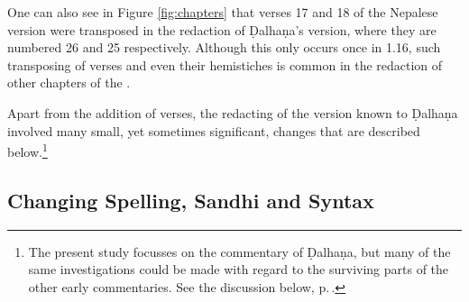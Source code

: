 One can also see in Figure \ref{fig:chapters} that verses 17 and 18 of the
Nepalese version were transposed in the redaction of Ḍalhaṇa's version, where
they are numbered 26 and 25 respectively. Although this only occurs once in 1.16,
such transposing of verses and even their hemistiches is common in the
redaction of other chapters of the \SS.

Apart from the addition of verses, the redacting of the version known to Ḍalhaṇa
involved many small, yet sometimes significant, changes that are described
below.\footnote{The present study focusses on the commentary of Ḍalhaṇa, but many
    of the same investigations could be made with regard to the surviving parts of the
    other early commentaries. See the discussion below, p.\,\pageref{ref:dalhana}.}

\subsection{Changing Spelling, Sandhi and Syntax}



